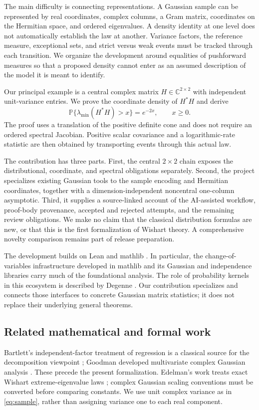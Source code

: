 \documentclass[11pt]{article}
\newcommand{\C}{\mathbb C}
\newcommand{\Prob}{\mathbb P}
\begin{document}
The main difficulty is connecting representations. A Gaussian sample can be
represented by real coordinates, complex columns, a Gram matrix, coordinates
on the Hermitian space, and ordered eigenvalues. A density identity at one level
does not automatically establish the law at another. Variance factors, the
reference measure, exceptional sets, and strict versus weak events must be
tracked through each transition. We organize the development around equalities
of pushforward measures so that a proposed density cannot enter as an assumed
description of the model it is meant to identify.

Our principal example is a central complex matrix $H\in\C^{2\times2}$ with
independent unit-variance entries. We prove the coordinate density of $H^*H$
and derive
\[
 \Prob\{\lambda_{\min}(H^*H)>x\}=e^{-2x},\qquad x\geq0.
\]
The proof uses a translation of the positive definite cone and does not require
an ordered spectral Jacobian. Positive scalar covariance and a logarithmic-rate
statistic are then obtained by transporting events through this actual law.

The contribution has three parts. First, the central $2\times2$ chain exposes
the distributional, coordinate, and spectral obligations separately. Second,
the project specializes existing Gaussian tools to the sample encoding and
Hermitian coordinates, together with a dimension-independent noncentral
one-column asymptotic. Third, it supplies a source-linked account of the
AI-assisted workflow, proof-body provenance, accepted and rejected attempts,
and the remaining review obligations. We make no claim that
the classical distribution formulas are new, or that this is the first
formalization of Wishart theory. A comprehensive novelty comparison remains
part of release preparation.

The development builds on Lean and mathlib \cite{mathlib}. In particular,
the change-of-variables infrastructure developed in mathlib \cite{gouezel}
and its Gaussian and independence libraries carry much of the foundational
analysis. The role of probability kernels in this ecosystem is described by
Degenne \cite{degenne}. Our contribution specializes and connects those
interfaces to concrete Gaussian matrix statistics; it does not replace their
underlying general theorems.

\subsection{Related mathematical and formal work}
Bartlett's independent-factor treatment of regression is a classical source
for the decomposition viewpoint \cite{bartlett}; Goodman developed multivariate
complex Gaussian analysis \cite{goodman}. These precede the present
formalization. Edelman's work treats exact Wishart extreme-eigenvalue laws
\cite{edelman1988,edelman1991}; complex Gaussian scaling conventions must be
converted before comparing constants. We use unit complex variance as in
\eqref{eq:sample}, rather than assigning variance one to each real component.
\end{document}
